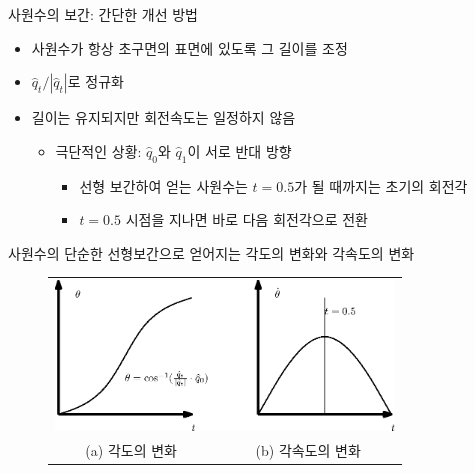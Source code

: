 \begin{frame}[fragile]{사원수의 보간: 간단한 개선 방법}

\begin{itemize}
\item 사원수가 항상 초구면의 표면에 있도록 그 길이를 조정
\item ${\hat q}_t / | {\hat q}_t |$로 정규화
\item 길이는 유지되지만 회전속도는 일정하지 않음
	\begin{itemize}
	\item 극단적인 상황: ${\hat q}_0$와 ${\hat q}_1$이 서로 반대 방향
		\begin{itemize}
		\item 선형 보간하여 얻는 사원수는 $t=0.5$가 될 때까지는 초기의 회전각
		\item $t=0.5$ 시점을 지나면 바로 다음 회전각으로 전환
		\end{itemize}
	\end{itemize}
\end{itemize}

사원수의 단순한 선형보간으로 얻어지는 각도의 변화와 각속도의 변화
\begin{figure}
  	\begin{tabular}{cc}
	 \multicolumn{2}{c}{\includegraphics[width=9cm]{Math_quaternion/quaternionLerpAngle.eps}} \\
	(a) 각도의 변화 & (b) 각속도의 변화 \\
	\end{tabular}
\end{figure}

\end{frame}

